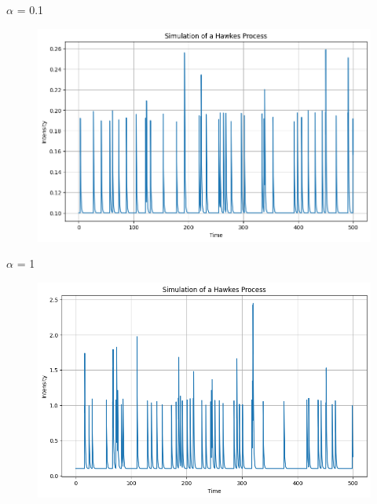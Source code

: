\begin{frame}
    \begin{block}{$\alpha$ = 0.1}
    \begin{figure}[h]
        \centering
        \includegraphics[width=0.6\linewidth]{figures/alpha2.png}
    \end{figure}
    \end{block}
\end{frame}

\begin{frame}
    \begin{block}{$\alpha$ = 1}
    \begin{figure}[h]
        \centering
        \includegraphics[width=0.6\linewidth]{figures/alpha3.png}
    \end{figure}
    \end{block}
\end{frame}

